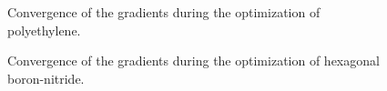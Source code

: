 \documentclass[prl,aps,preprint,superbib,12pt]{revtex4}
\begin{document}
\begin{figure}[h]
\caption{Convergence of the gradients during the optimization 
of polyethylene.}
\label{ch2-grads}
\end{figure}

\begin{figure}[h]
\caption{Convergence of the gradients during the optimization
of hexagonal boron-nitride.}
\label{BN1x1-grads}
\end{figure}
\end{document}
